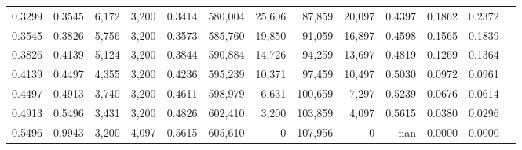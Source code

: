 \begin{tabular}{rrrrrrrrrrrrr}
0.3299 & 0.3545 &  6,172 & 3,200 &                                     0.3414 & 580,004 &  25,606 &  87,859 &  20,097 & 0.4397 & 0.1862 & 0.2372 \\
0.3545 & 0.3826 &  5,756 & 3,200 &                                     0.3573 & 585,760 &  19,850 &  91,059 &  16,897 & 0.4598 & 0.1565 & 0.1839 \\
0.3826 & 0.4139 &  5,124 & 3,200 &                                     0.3844 & 590,884 &  14,726 &  94,259 &  13,697 & 0.4819 & 0.1269 & 0.1364 \\
0.4139 & 0.4497 &  4,355 & 3,200 &                                     0.4236 & 595,239 &  10,371 &  97,459 &  10,497 & 0.5030 & 0.0972 & 0.0961 \\
0.4497 & 0.4913 &  3,740 & 3,200 &                                     0.4611 & 598,979 &   6,631 & 100,659 &   7,297 & 0.5239 & 0.0676 & 0.0614 \\
0.4913 & 0.5496 &  3,431 & 3,200 &                                     0.4826 & 602,410 &   3,200 & 103,859 &   4,097 & 0.5615 & 0.0380 & 0.0296 \\
0.5496 & 0.9943 &  3,200 & 4,097 &                                     0.5615 & 605,610 &       0 & 107,956 &       0 &    nan & 0.0000 & 0.0000 \\
\bottomrule
\end{tabular}
